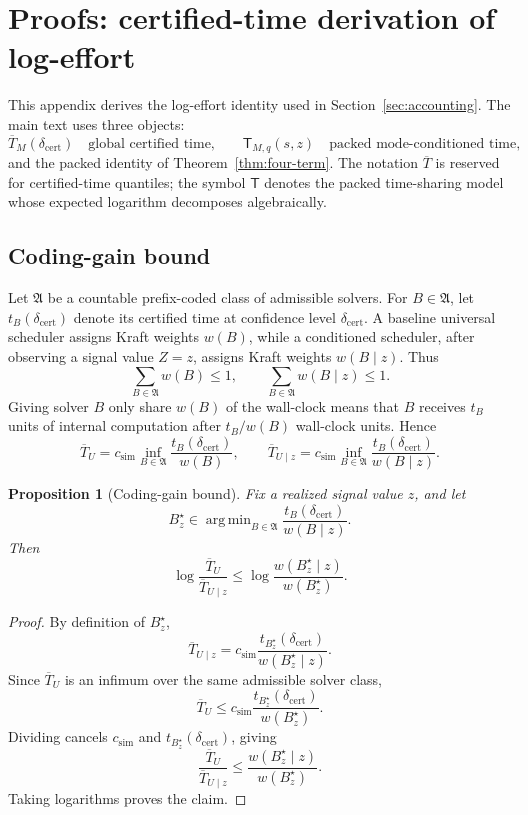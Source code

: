 \documentclass{article}
\newtheorem{proposition}{Proposition}
\DeclareMathOperator*{\argmin}{arg\,min}
\begin{document}
\section{Proofs: certified-time derivation of log-effort}
\label{app:certified-log-effort}

This appendix derives the log-effort identity used in Section~\ref{sec:accounting}.
The main text uses three objects:
\[
    \overline T_M(\delta_{\mathrm{cert}})
    \quad\text{global certified time,}
    \qquad
    \mathsf T_{M,q}(s,z)
    \quad\text{packed mode-conditioned time,}
\]
and the packed identity of Theorem~\ref{thm:four-term}.
The notation \(\overline T\) is reserved for certified-time quantiles; the symbol
\(\mathsf T\) denotes the packed time-sharing model whose expected logarithm decomposes
algebraically.

\subsection{Coding-gain bound}

Let \(\mathfrak A\) be a countable prefix-coded class of admissible solvers.  For
\(B\in\mathfrak A\), let \(t_B(\delta_{\mathrm{cert}})\) denote its certified time at
confidence level \(\delta_{\mathrm{cert}}\).  A baseline universal scheduler assigns Kraft
weights \(w(B)\), while a conditioned scheduler, after observing a signal value \(Z=z\),
assigns Kraft weights \(w(B\mid z)\).  Thus
\[
    \sum_{B\in\mathfrak A}w(B)\le 1,
    \qquad
    \sum_{B\in\mathfrak A}w(B\mid z)\le 1.
\]
Giving solver \(B\) only share \(w(B)\) of the wall-clock means that \(B\) receives
\(t_B\) units of internal computation after \(t_B/w(B)\) wall-clock units.  Hence
\[
    \overline T_U
    =
    c_{\mathrm{sim}}
    \inf_{B\in\mathfrak A}
    \frac{t_B(\delta_{\mathrm{cert}})}{w(B)},
    \qquad
    \overline T_{U\mid z}
    =
    c_{\mathrm{sim}}
    \inf_{B\in\mathfrak A}
    \frac{t_B(\delta_{\mathrm{cert}})}{w(B\mid z)}.
\]

\begin{proposition}[Coding-gain bound]
\label{prop:app-coding-gain}
Fix a realized signal value \(z\), and let
\[
    B_z^\star
    \in
    \argmin_{B\in\mathfrak A}
    \frac{t_B(\delta_{\mathrm{cert}})}{w(B\mid z)}.
\]
Then
\[
    \log\frac{\overline T_U}{\overline T_{U\mid z}}
    \le
    \log\frac{w(B_z^\star\mid z)}{w(B_z^\star)}.
\]
\end{proposition}

\begin{proof}
By definition of \(B_z^\star\),
\[
    \overline T_{U\mid z}
    =
    c_{\mathrm{sim}}
    \frac{t_{B_z^\star}(\delta_{\mathrm{cert}})}
         {w(B_z^\star\mid z)}.
\]
Since \(\overline T_U\) is an infimum over the same admissible solver class,
\[
    \overline T_U
    \le
    c_{\mathrm{sim}}
    \frac{t_{B_z^\star}(\delta_{\mathrm{cert}})}
         {w(B_z^\star)}.
\]
Dividing cancels \(c_{\mathrm{sim}}\) and \(t_{B_z^\star}(\delta_{\mathrm{cert}})\), giving
\[
    \frac{\overline T_U}{\overline T_{U\mid z}}
    \le
    \frac{w(B_z^\star\mid z)}{w(B_z^\star)}.
\]
Taking logarithms proves the claim.
\end{proof}
\end{document}

